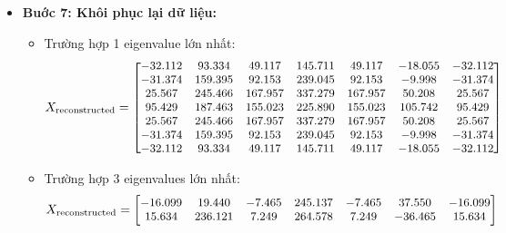 \begin{itemize}
\begin{itemize}
\begin{align*}
\begin{bmatrix}
                                -113.006 & -185.804 & 203.735 & -60.154 & 203.735 & 64.500 & -113.006 \\
                                -9.012 & 184.881 & 71.466 & -185.925 & 71.466 & -123.864 & -9.012
                                \end{bmatrix}
                            \end{align*}
                    \end{itemize}
                \item \textbf{Buớc 7: Khôi phục lại dữ liệu:}
                    \begin{itemize}
                        \item Trường hợp 1 eigenvalue lớn nhất:
                            \begin{align*}
                                \small
                                X_{\text{reconstructed}} = \begin{bmatrix}
                                -32.112 & 93.334 & 49.117 & 145.711 & 49.117 & -18.055 & -32.112 \\
                                -31.374 & 159.395 & 92.153 & 239.045 & 92.153 & -9.998 & -31.374 \\
                                25.567 & 245.466 & 167.957 & 337.279 & 167.957 & 50.208 & 25.567 \\
                                95.429 & 187.463 & 155.023 & 225.890 & 155.023 & 105.742 & 95.429 \\
                                25.567 & 245.466 & 167.957 & 337.279 & 167.957 & 50.208 & 25.567 \\
                                -31.374 & 159.395 & 92.153 & 239.045 & 92.153 & -9.998 & -31.374 \\
                                -32.112 & 93.334 & 49.117 & 145.711 & 49.117 & -18.055 & -32.112
                                \end{bmatrix}
                            \end{align*}
                        \item Trường hợp 3 eigenvalues lớn nhất:
                            \begin{align*}
                                \small
                                X_{\text{reconstructed}} = \begin{bmatrix}
                                -16.099 & 19.440 & -7.465 & 245.137 & -7.465 & 37.550 & -16.099 \\
                                15.634 & 236.121 & 7.249 & 264.578 & 7.249 & -36.465 & 15.634 \\

\end{bmatrix}
\end{align*}
\end{itemize}
\end{itemize}
